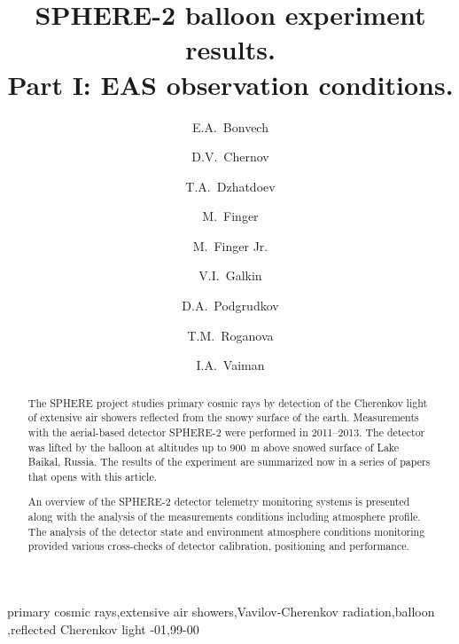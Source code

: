 \documentclass[final,5p,times,twocolumn]{elsarticle}
\begin{document}
\newcommand{\todoi}[1]{\todo[inline]{ #1}}
\linenumbers

\begin{frontmatter}
\title{SPHERE-2 balloon experiment results.\\ Part I: EAS observation conditions.}


\author[address1]{E.A.~Bonvech}
\author[address1]{D.V.~Chernov}
\author[address1]{T.A.~Dzhatdoev}
\author[address2,address3]{M.~Finger}
\author[address2,address3]{M.~Finger Jr.}
\author[address4]{V.I.~Galkin}
\author[address4,address1]{D.A.~Podgrudkov}
\author[address1]{T.M.~Roganova}
\author[address4,address1]{I.A.~Vaiman}
\address[address1]{M.V. Lomonosov Moscow State University, Skobeltsyn Institute of Nuclear Physics (SINP MSU), Moscow, Russia}
\address[address2]{Charles University, Faculty of Mathematics and Physics, Prague, Czech Republic}
\address[address3]{Joint Institute for Nuclear Research, Dubna, Russian Federation}
\address[address4]{M.V. Lomonosov Moscow State University, Faculty of Physics, Moscow, Russia}

\begin{abstract}
The SPHERE project studies primary cosmic rays by detection of the Cherenkov light of extensive air showers reflected from the snowy surface of the earth. Measurements with the aerial-based detector SPHERE-2 were performed in 2011--2013. The detector was lifted by the balloon at altitudes up to 900~m above snowed surface of Lake Baikal, Russia. The results of the experiment are summarized now in a series of papers that opens with this article.


An overview of the SPHERE-2 detector telemetry monitoring systems is presented along with the analysis of the measurements conditions including atmosphere profile. The analysis of the detector state and environment atmosphere conditions monitoring provided various cross-checks of detector calibration, positioning and performance.
\end{abstract}

\begin{keyword}
primary cosmic rays\sep extensive air showers\sep Vavilov-Cherenkov radiation\sep balloon \sep reflected Cherenkov light
-01\sep  99-00
\end{keyword}

\end{frontmatter}
\end{document}
